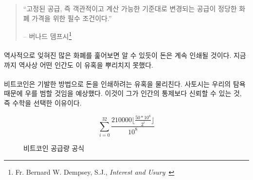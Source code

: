 \begin{quotation}\begin{samepage}
		\begin{comment}	
			\enquote{A fixed money supply, or a supply altered only in accord with
				objective and calculable criteria, is a necessary condition to a
				meaningful just price of money.}
		\end{comment}
		\enquote{고정된 공급, 즉 객관적이고 계산 가능한 기준대로 변경되는 공급이 정당한 화폐 가격을 위한 필수 조건이다.}
		\begin{flushright} -- 버나드 뎀프시\footnote{Fr. Bernard W. Dempsey, S.J., \textit{Interest and Usury}~\cite[p.~210]{dempsey_interest_1943}}
\end{flushright}\end{samepage}\end{quotation}

\newpage

\paragraph{}
\begin{comment}	
	As a quick stroll through the graveyard of forgotten currencies has
	shown, money which can be printed will be printed. So far, no human in
	history was able to resist this temptation.
\end{comment}
역사적으로 잊혀진 많은 화폐를 훑어보면 알 수 있듯이 돈은 계속 인쇄될 것이다. 
지금까지 역사상 어떤 인간도 이 유혹을 뿌리치지 못했다.

\paragraph{}
\begin{comment}	
	Bitcoin does away with the temptation to print money in an ingenious
	way. Satoshi was aware of our greed and fallibility --- this is why he
	chose something more reliable than human restraint: mathematics.
\end{comment}
비트코인은 기발한 방법으로 돈을 인쇄하려는 유혹을 물리친다. 
사토시는 우리의 탐욕 때문에 우를 범할 것임을 예상했다.
이것이 그가 인간의 통제보다 신뢰할 수 있는 것, 즉 수학을 선택한 이유이다.

\begin{figure}
	\centering
	\begin{equation}
		\sum\limits_{i=0}^{32} \frac{210000 \lfloor \frac{50*10^8}{2^i} \rfloor}{10^8}
	\end{equation}
	\caption{비트코인 공급량 공식}
	\label{fig:supply-formula-white}
\end{figure}


